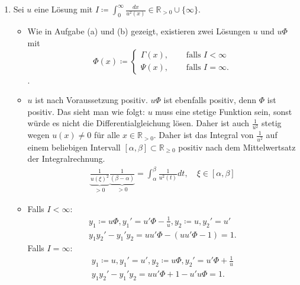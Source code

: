 \documentclass[a4paper, landscape,twocolumn,fontsize=8pt,DIV=1]{scrartcl}
\theoremstyle{plain}
\begin{document}
\begin{enumerate}[label=(\alph*)]
\begin{proof}
        Sei $w \coloneqq u\Psi$, wobei $u$ wie in Aufgabe 3(a) definiert ist.
        \begin{align*}
            w' &= u' \Psi + u \Psi' = u'\Psi + \frac{u}{u^2} = u'\Psi + \frac{1}{u} \\
            w'' &= u'' \Psi + u'\Psi' - \frac{u'}{u^2} = u'' \Psi + \frac{u'}{u^2} - \frac{u'}{u^2} = u'' \Psi.
        \end{align*}
        Verifiziere den Ansatz $w = u\Psi$ für $(\star\star)$. 
        \begin{align*}
            w'' +pw = u'' \Psi + p u\Psi = \Psi(u'' +pu) \overset{\eqref{xD}}{=} \Psi \cdot 0 = 0. 
        \end{align*}
    \end{proof}
    
    
    \item Sei $u$ eine Lösung mit $I \coloneqq \int^\infty_0\frac{dx}{u^2(x)} \in \mathbb R_{>0} \cup \{ \infty \}$. 
    
    \begin{itemize}
        \item Wie in Aufgabe (a) und (b) gezeigt, existieren zwei Lösungen $u$ und $u \Phi$ mit $$\Phi(x) \coloneqq \begin{cases} \Gamma(x), &\quad \text{ falls $I < \infty$} \\ \Psi(x), &\quad \text{ falls $I = \infty$.} \end{cases}$$.
        
        \item $u$ ist nach Voraussetzung positiv. $u \Phi$ ist ebenfalls positiv, denn $\Phi$ ist positiv. Das sieht man wie folgt: $u$ muss eine stetige Funktion sein, sonst würde es nicht die Differentialgleichung lösen. Daher ist auch $\frac{1}{u^2}$ stetig wegen $u(x) \neq 0$ für alle $x \in \mathbb R_{>0}$. Daher ist das Integral von $\frac{1}{u^2}$ auf einem beliebigen Intervall $[\alpha, \beta] \subset \mathbb R_{\geq 0}$ positiv nach dem Mittelwertsatz der Integralrechnung.
        \begin{align*}
            \underbrace{\frac{1}{u(\xi)^2}}_{> 0}\underbrace{\frac{1}{(\beta - \alpha)}}_{>0} = \int^\beta_\alpha\frac{1}{u^2(t)}dt, \quad \xi \in [\alpha, \beta]
        \end{align*}
        
        \item Falls $I < \infty$:
        \begin{gather*}
            y_1 \coloneqq u\Phi, y_1' = u'\Phi - \frac{1}{u}, y_2 \coloneqq u, y_2' = u'\\
            y_1y_2'-y_1'y_2 = uu'\Phi - (uu'\Phi -1) = 1.
        \end{gather*}
        Falls $I = \infty:$ 
        \begin{gather*}
            y_1 \coloneqq u, y_1' = u', y_2 \coloneqq u\Phi, y_2' = u'\Phi + \frac{1}{u}\\
            y_1y_2'-y_1'y_2 = uu'\Phi +1 - u'u\Phi = 1.
        \end{gather*}


\end{itemize}
\end{enumerate}
\end{document}
